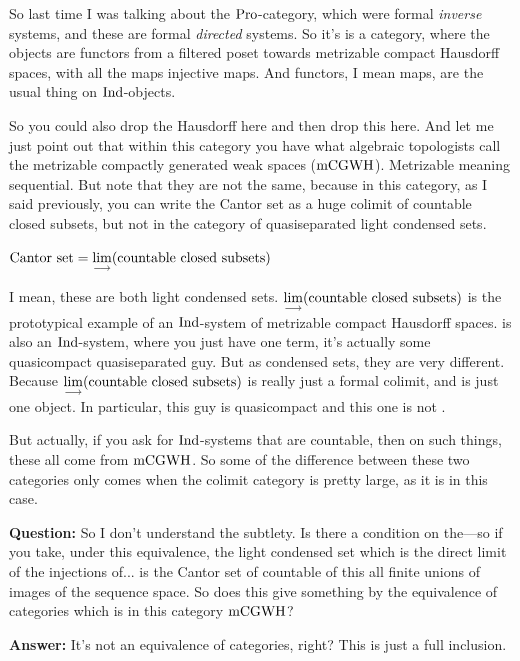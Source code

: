 So last time I was talking about the $\operatorname{Pro}$-category, which were formal \emph{inverse} systems, and these are formal \emph{directed} systems. So it's is a category, where the objects are functors from a filtered poset towards metrizable compact Hausdorff spaces, with all the maps injective maps. And functors, I mean maps, are the usual thing on $\mathrm{Ind}$-objects.

So you could also drop the Hausdorff here and then drop this here. And let me just point out that within this category you have what algebraic topologists call the metrizable compactly generated weak spaces ($\mathrm{mCGWH}$). Metrizable meaning sequential. 
But note that they are not the same, because in this category, as I said previously, you can write the Cantor set as a huge colimit of countable closed subsets, but not in the category of quasiseparated light condensed sets.

$\text{Cantor set} = \mathop{\operatorname*{lim}\limits_{\longrightarrow}}\limits (\text{countable closed subsets})$

I mean, these are both light condensed sets. $\mathop{\operatorname*{lim}\limits_{\longrightarrow}}\limits (\text{countable closed subsets})$ is the prototypical example of an $\mathrm{Ind}$-system of metrizable compact Hausdorff spaces.  is also an $\mathrm{Ind}$-system, where you just have one term, it's actually some quasicompact quasiseparated guy. But as condensed sets, they are very different. 
Because $\mathop{\operatorname*{lim}\limits_{\longrightarrow}}\limits (\text{countable closed subsets})$ is really just a formal colimit, and  is just one object. In particular, this guy is quasicompact and this one is not .

But actually, if you ask for $\mathrm{Ind}$-systems that are countable, then on such things, these all come from $\mathrm{mCGWH}$. So some of the difference between these two categories only comes when the colimit category is pretty large, as it is in this case.

\textbf{Question:} So I don't understand the subtlety. Is there a condition on the---so if you take, under this equivalence, the light condensed set which is the direct limit of the injections of... is the Cantor set of countable of this all finite unions of images of the sequence space.
So does this give something by the equivalence of categories which is in this category $\mathrm{mCGWH}$? 

\textbf{Answer:} It's not an equivalence of categories, right? This is just a full inclusion. 


